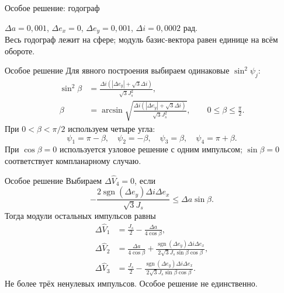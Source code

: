 \documentclass[11pt,aspectratio=169,t]{beamer}
\newcommand{\figcaption}[1]{{\usebeamerfont{caption}\color{coursemuted}#1\par}}
\newcommand{\derivationmathspacing}{%
  \setlength{\abovedisplayskip}{2pt}%
  \setlength{\belowdisplayskip}{3pt}%
  \setlength{\abovedisplayshortskip}{2pt}%
  \setlength{\belowdisplayshortskip}{2pt}%
  \setlength{\jot}{2pt}}
\begin{document}
\begin{frame}{Особое решение: годограф}
\relax
\centering

\par
\figcaption{$\Delta a=0{,}001$, $\Delta e_x=0$, $\Delta e_y=0{,}001$, $\Delta i=0{,}0002$ рад.\\
Весь годограф лежит на сфере; модуль базис-вектора равен единице на всём обороте.}
\end{frame}

\begin{frame}{Особое решение}
\relax
\derivationmathspacing
Для явного построения выбираем одинаковые $\sin^2\psi_j$:
\[
\begin{aligned}
\sin^2\beta&=\frac{\Delta i(|\Delta e_y|+\sqrt3\Delta i)}{\sqrt3J_s^2},\\
\beta&=\arcsin\sqrt{\frac{\Delta i(|\Delta e_y|+\sqrt3\Delta i)}
{\sqrt3J_s^2}},
\qquad 0\leq\beta\leq\frac\pi2.
\end{aligned}
\]
\medskip
При $0<\beta<\pi/2$ используем четыре угла:
\[
\psi_1=\pi-\beta,\quad \psi_2=-\beta,\quad
\psi_3=\beta,\quad \psi_4=\pi+\beta.
\]
\medskip
\justifying
При $\cos\beta=0$ используется узловое решение с одним импульсом;
$\sin\beta=0$ соответствует компланарному случаю.
\end{frame}

\begin{frame}{Особое решение}
\relax
\derivationmathspacing
Выбираем $\Delta\widehat V_4=0$, если
\[
-\frac{2\operatorname{sgn}(\Delta e_y)\Delta i\Delta e_x}{\sqrt3J_s}
\leq\Delta a\sin\beta.
\]
Тогда модули остальных импульсов равны
\[
\begin{aligned}
\Delta\widehat V_1&=\frac{J_s}{2}-\frac{\Delta a}{4\cos\beta},\\
\Delta\widehat V_2&=\frac{\Delta a}{4\cos\beta}
+\frac{\operatorname{sgn}(\Delta e_y)\Delta i\Delta e_x}
{2\sqrt3J_s\sin\beta\cos\beta},\\
\Delta\widehat V_3&=\frac{J_s}{2}
-\frac{\operatorname{sgn}(\Delta e_y)\Delta i\Delta e_x}
{2\sqrt3J_s\sin\beta\cos\beta}.
\end{aligned}
\]
\medskip
\justifying
Не более трёх ненулевых импульсов. Особое решение не единственно.
\end{frame}
\end{document}
